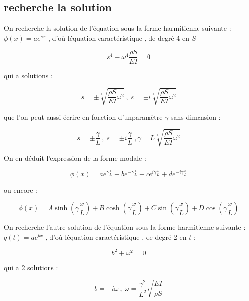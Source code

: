 \documentclass[a4paper,10pt]{report} %
\begin{document}
\subsection{recherche la solution}

On recherche la solution de l'équation sous la forme harmitienne suivante :
   $\phi (x)=ae^{sx}$ , d'où léquation caractéristique , de degré 4 en $S$ :

\begin{equation}
	s^4-\omega^4\frac{\rho S}{EI}=0
	\label{equation5}
\end{equation}

qui a solutions :

\begin{equation}
    s=\pm \sqrt[4]{\frac{\rho S}{EI}{\omega^2}}\ ,\ s=\pm i\sqrt[4]{\frac{\rho S}{EI}{\omega^2}}
    \label{equation6}
\end{equation}

que l'on peut aussi écrire en fonction d'unparamètre $\gamma$ sans dimension :

\begin{equation}
    s=\pm\frac{\gamma}{L}\ ,\ s=\pm i\frac{\gamma}{L}\ , \gamma=L\sqrt[4]{\frac{\rho S}{EI}{\omega^2}}
    \label{equation7}
\end{equation}


On en déduit l'expression de la forme modale :

\begin{equation}
    \phi (x)=ae^{\gamma\frac{x}{L}}+be^{-\gamma\frac{x}{L}}+ce^{i\gamma\frac{x}{L}}+de^{-i\gamma\frac{x}{L}} 
    \label{equation8}
\end{equation}

ou encore :


\begin{equation}
    \phi (x)=A\sinh{(\gamma\frac{x}{L})}+B\cosh{(\gamma\frac{x}{L})}+C\sin{(\gamma\frac{x}{L})}+D\cos{(\gamma\frac{x}{L})}
    \label{equation9}
\end{equation}

On recherche l'autre solution de l'équation sous la forme harmitienne suivante : 
$q(t)=ae^{bx}$ , d'où léquation caractéristique , de degré 2 en $t$ :

\begin{equation}
    b^2+\omega^2=0
    \label{equation10}
\end{equation}

qui a 2 solutions :

\begin{equation}
    b=\pm i\omega\ , \ \omega=\frac{\gamma^2}{L^2}\sqrt{\frac{EI}{\rho S}}
    \label{equation11}
\end{equation}
\end{document}
